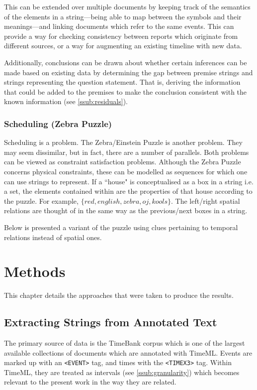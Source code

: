 \documentclass[a4paper,12pt,leqno]{article}
\newcommand{\xmltag}[2][]{\texttt{\textless{}#2#1\textgreater{}}}
\begin{document}
This can be extended over multiple documents by keeping track of the semantics of the elements in a string---being able to map between the symbols and their meanings---and linking documents which refer to the same events. This can provide a way for checking consistency between reports which originate from different sources, or a way for augmenting an existing timeline with new data.

Additionally, conclusions can be drawn about whether certain inferences can be made based on existing data by determining the gap between premise strings and strings representing the question statement. That is, deriving the information that could be added to the premises to make the conclusion consistent with the known information (see \cref{ssub:residuals}).

\subsubsection{Scheduling (Zebra Puzzle)}\label{ssub:zebra}
Scheduling is a problem. The Zebra/Einstein Puzzle is another problem. They may seem dissimilar, but in fact, there are a number of parallels. Both problems can be viewed as constraint satisfaction problems. Although the Zebra Puzzle concerns physical constraints, these can be modelled as sequences for which one can use strings to represent. If a ``house" is conceptualised as a box in a string i.e. a set, the elements contained within are the properties of that house according to the puzzle. For example, $\{red, english, zebra, oj, kools\}$. The left/right spatial relations are thought of in the same way as the previous/next boxes in a string.

Below is presented a variant of the puzzle using clues pertaining to temporal relations instead of spatial ones.

\newpage
\section{Methods}\label{sec:methods}
This chapter details the approaches that were taken to produce the results.

\subsection{Extracting Strings from Annotated Text}\label{sub:extracting}
The primary source of data is the TimeBank corpus which is one of the largest available collections of documents which are annotated with TimeML. Events are marked up with an \xmltag{EVENT} tag, and times with the \xmltag{TIMEX3} tag. Within TimeML, they are treated as intervals (see \cref{ssub:granularity}) which becomes relevant to the present work in the way they are related.
\end{document}
